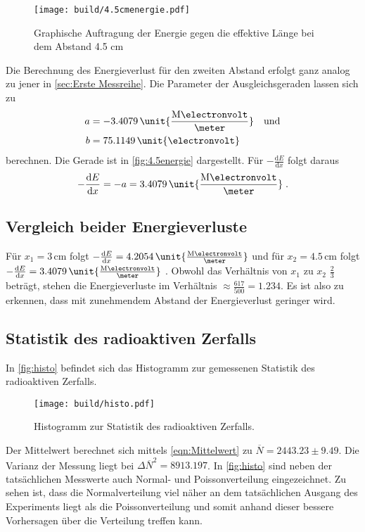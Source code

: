 \begin{figure}
  \centering
  \texttt{[image: build/4.5cmenergie.pdf]}
  \caption{Graphische Auftragung der Energie gegen die effektive Länge bei dem Abstand 4.5 $\unit{\cm}$}
  \label{fig:4.5energie}
\end{figure}

Die Berechnung des Energieverlust für den zweiten Abstand erfolgt ganz analog zu jener in \autoref{sec:Erste Messreihe}.
Die Parameter der Ausgleichsgeraden lassen sich zu
\begin{align*}
  a& = -3.4079\,  \unit{\frac{\text{M}\electronvolt}{\meter}}\quad \text{und}\\
  b&= 75.1149 \,  \unit{\electronvolt}
\end{align*}
berechnen. Die Gerade ist in \autoref{fig:4.5energie} dargestellt.
Für $-\frac{\text{d}E}{\text{d}x}$ folgt daraus
\begin{equation*}
  -\frac{\text{d}E}{\text{d}x}=-a = 3.4079\, \unit{\frac{\text{M}\electronvolt}{\meter}}\; .
\end{equation*}

\subsection{Vergleich beider Energieverluste}
Für $x_1= 3\,\unit{\cm} $ folgt $-\frac{\text{d}E}{\text{d}x}=4.2054 \, \unit{\frac{\text{M}\electronvolt}{\meter}}$ und für $x_2= 4.5\,\unit{\cm}$ folgt $-\frac{\text{d}E}{\text{d}x}=3.4079 \,\unit{\frac{\text{M}\electronvolt}{\meter}}$ .
Obwohl das Verhältnis von $x_1$ zu $x_2$ $\frac{2}{3}$ beträgt, stehen die Energieverluste im Verhältnis $\approx \frac{617}{500}=1.234$.
Es ist also zu erkennen, dass mit zunehmendem Abstand der Energieverlust geringer wird.

\subsection{Statistik des radioaktiven Zerfalls}
In \autoref{fig:histo} befindet sich das Histogramm zur gemessenen Statistik des radioaktiven Zerfalls.

\begin{figure}
  \centering
  \texttt{[image: build/histo.pdf]}
  \caption{Histogramm zur Statistik des radioaktiven Zerfalls.}
  \label{fig:histo}
\end{figure}

Der Mittelwert berechnet sich mittels \autoref{eqn:Mittelwert} zu $\overline{N} = 2443.23 \pm 9.49$. Die Varianz
der Messung liegt bei ${\Delta\overline{N}}^2 = 8913.197$.
In \autoref{fig:histo} sind neben der tatsächlichen Messwerte auch Normal- und Poissonverteilung eingezeichnet.
Zu sehen ist, dass die Normalverteilung viel näher an dem tatsächlichen Ausgang des Experiments liegt als die Poissonverteilung und somit 
anhand dieser bessere Vorhersagen über die Verteilung treffen kann.